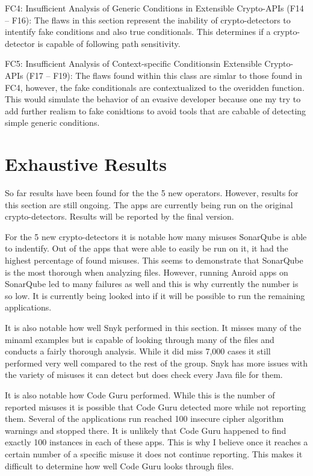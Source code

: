 FC4: Insufficient Analysis of Generic Conditions in Extensible Crypto-APIs (F14 – F16): The flaws in this section represent the inability of crypto-detectors to intentify fake conditions and also true conditionals. This determines if a crypto-detector is capable of following path sensitivity.

FC5: Insufficient Analysis of Context-specific Conditionsin Extensible Crypto-APIs (F17 – F19): The flaws found within this class are simlar to those found in FC4, however, the fake conditionals are contextualized to the overidden function. This would simulate the behavior of an evasive developer because one my try to add further realism to fake conidtions to avoid tools that are cabable of detecting simple generic conditions.


\section{Exhaustive Results}
\label{ch5:sec:discussion}



So far results have been found for the the 5 new operators. However, results for this section are still ongoing. The apps are currently being run on the original crypto-detectors. Results will be reported by the final version.

For the 5 new crypto-detectors it is notable how many misuses SonarQube is able to indentify. Out of the apps that were able to easily be run on it, it had the highest percentage of found misuses. This seems to demonstrate that SonarQube is the most thorough when analyzing files. However, running Anroid apps on SonarQube led to many failures as well and this is why currently the number is so low. It is currently being looked into if it will be possible to run the remaining applications. 

It is also notable how well Snyk performed in this section. It misses many of the minaml examples but is capable of looking through many of the files and conducts a fairly thorough analysis. While it did miss 7,000 cases it still performed very well compared to the rest of the group. Snyk has more issues with the variety of misuses it can detect but does check every Java file for them.

It is also notable how Code Guru performed. While this is the number of reported misuses it is possible that Code Guru detected more while not reporting them. Several of the applications run reached 100 insecure cipher algorithm warnings and stopped there. It is unlikely that Code Guru happened to find exactly 100 instances in each of these apps. This is why I believe once it reaches a certain number of a specific misuse it does not continue reporting. This makes it difficult to determine how well Code Guru looks through files.